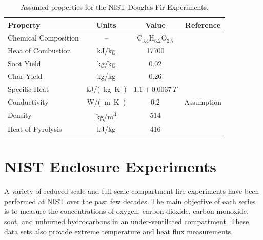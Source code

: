 \begin{table}
\centering
\caption[Assumed properties for the NIST Douglas Fir Experiments]{Assumed properties for the NIST Douglas Fir Experiments.}
\label{Assumed_Properties_Trees}
\begin{tabular}{|l|c|c|c|}
\hline
Property                        & Units                 & Value                              & Reference                             \\ \hline \hline
Chemical Composition            & --                    & C$_{3.4}$H$_{6.2}$O$_{2.5}$        & \cite{Ritchie:1}                      \\ \hline
Heat of Combustion              & kJ/kg                 & 17700                              & \cite{Susott:FS1982}                  \\ \hline
Soot Yield                      & kg/kg                 & 0.02                               & \cite{Mell:2009}                      \\ \hline
Char Yield                      & kg/kg                 & 0.26                               & \cite{Susott:FS1982}                  \\ \hline
Specific Heat                   & \unit{kJ/(kg.K)}       & $1.1+0.0037 \, T$                  & \cite{Parker:1989}                    \\ \hline
Conductivity                    & \unit{W/(m.K)}         & 0.2                                & Assumption                            \\ \hline
Density                         & \unit{kg/m^3}              & 514                                & \cite{Rothermel:1972}                 \\ \hline
Heat of Pyrolysis               & kJ/kg                 & 416                                & \cite{Morvan:CF2004}                  \\ \hline
\end{tabular}
\end{table}


\section{NIST Enclosure Experiments}
\label{NIST_Enclosure_Description}

A variety of reduced-scale and full-scale compartment fire experiments have been performed at NIST over the past few decades. The main objective of each series is to measure the concentrations of oxygen, carbon dioxide, carbon monoxide, soot, and unburned hydrocarbons in an under-ventilated compartment. These data sets also provide extreme temperature and heat flux measurements.

